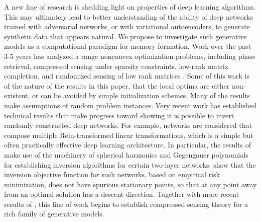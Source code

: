 A new line of research is shedding light on properties of deep
learning algorithms. This may ultimately lead to better understanding
of the ability of deep networks trained with adversarial networks, or
with variational autoencoders, to generate synthetic data that appears
natural. We propose to investigate such generative models as a
computational paradigm for memory formation. 
Work over the past 3-5 years has analyzed a range nonconvex
optimization problems, including phase retrieval, compressed
sensing under sparsity constraints, low-rank matrix
completion, and randomized sensing of low rank matrices
\cite{phaselift_1,phaselift_2,phaselift_3,ZhaWanLiu15,WeiCaiCha16,ZheLaf15,phaselift_1,phaselift_2,phaselift_3,ZhaWanLiu15,WeiCaiCha16}.
Some of this work is of the nature of the results in this
paper, that the local optima are either non-existent, or
can be avoided by simple initialization schemes. Many of
the results make assumptions of random problem instances.
Very recent work has established technical results
that make progress toward showing it is possible to invert randomly constructed
deep networks. For example, networks are considered that compose multiple Relu-transformed linear transformations,
which is a simple but often practically effective  deep learning architecture.
In particular, the results of \cite{Mixon18} make use of the machinery
of spherical harmonics and Gegengauer polynomials for establishing
inversion algorithms for certain two-layer networks.
\cite{HandV17} show that the inversion objective function for such networks, based
on empirical risk minimization, does not have spurious stationary points,
so that at any point away from an optimal solution has a descent
direction. Together with more recent results of \cite{HandV18},
this line of work begins to establish compressed sensing theory
for a rich family of generative models. 




